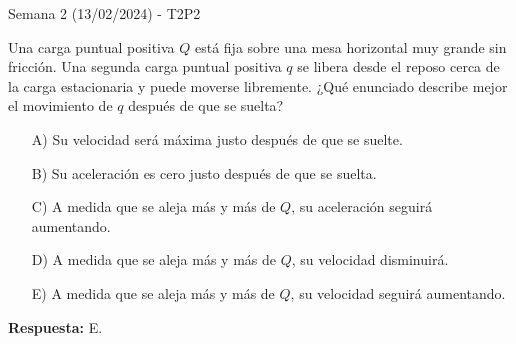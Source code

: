 \begin{frame}{Semana 2 (13/02/2024) - T2P2}
    
    Una carga puntual positiva $Q$ está fija sobre una mesa horizontal muy grande sin fricción. Una segunda carga puntual positiva $q$ se libera desde el reposo cerca de la carga estacionaria y puede moverse libremente. ¿Qué enunciado describe mejor el movimiento de $q$ después de que se suelta?
    
    \begin{itemize}
    
    \item[A)]Su velocidad será máxima justo después de que se suelte.

    \item[B)] Su aceleración es cero justo después de que se suelta.
    
    \item[C)] A medida que se aleja más y más de $Q$, su aceleración seguirá aumentando.
    
    \item[D)] A medida que se aleja más y más de $Q$, su velocidad disminuirá.
    
    \item[E)] A medida que se aleja más y más de $Q$, su velocidad seguirá aumentando.
    \end{itemize}
    
    \pause\bigskip\centering\textbf{Respuesta:} E.
    
\end{frame}

